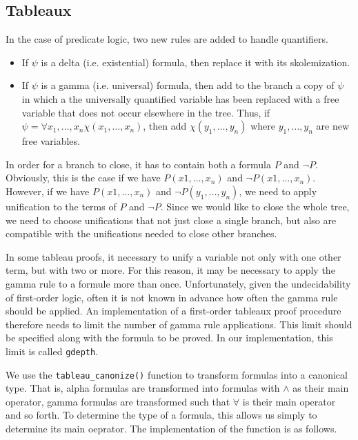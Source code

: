 \documentclass[a4paper,notitlepage]{scrartcl}
\begin{document}
\subsection{Tableaux}

In the case of predicate logic, two new rules are added to handle quantifiers.

\begin{itemize}
\item
If $\psi$ is a delta (i.e. existential) formula, then replace it with its
skolemization.

\item
If $\psi$ is a gamma (i.e. universal) formula, then add to the branch a copy of
$\psi$ in which a the universally quantified variable has been replaced with a
free variable that does not occur elsewhere in the tree. Thus, if $\psi =
\forall x_1, \ldots, x_n \chi(x_1, \ldots, x_n)$, then add $\chi(y_1, \ldots,
y_n)$ where $y_1, \ldots, y_n$ are new free variables.
\end{itemize}

In order for a branch to close, it has to contain both a formula $P$ and $\lnot
P$. Obviously, this is the case if we have $P(x1, \ldots, x_n)$ and $\lnot
P(x1, \ldots, x_n)$. However, if we have $P(x1, \ldots, x_n)$ and $\lnot P(y_1,
\ldots, y_n)$, we need to apply unification to the terms of $P$ and $\lnot P$.
Since we would like to close the whole tree, we need to choose unifications
that not just close a single branch, but also are compatible with the
unifications needed to close other branches.

In some tableau proofs, it necessary to unify a variable not only with one
other term, but with two or more. For this reason, it may be necessary to apply
the gamma rule to a formule more than once. Unfortunately, given the
undecidability of first-order logic, often it is not known in advance how often
the gamma rule should be applied. An implementation of a first-order tableaux
proof procedure therefore needs to limit the number of gamma rule applications.
This limit should be specified along with the formula to be proved. In our
implementation, this limit is called \texttt{gdepth}.

We use the \texttt{tableau\_canonize()} function to transform formulas into a
canonical type. That is, alpha formulas are transformed into formulas with
$\land$ as their main operator, gamma formulas are transformed such that
$\forall$ is their main operator and so forth. To determine the type of a
formula, this allows us simply to determine its main oeprator. The
implementation of the function is as follows.
\end{document}
